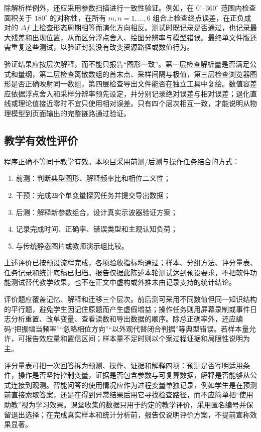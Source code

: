 \documentclass[UTF8,a4paper,zihao=-4]{ctexart}
\begin{document}
除解析样例外，还应采用参数扫描进行一致性验证。例如，在 $0^\circ$--$360^\circ$ 范围内检查面积关于 $180^\circ$ 的对称性，在所有 $m,n=1,\ldots,6$ 组合上检查终点误差，在正负成对的 $\Delta f$ 上检查形态周期相等而演化方向相反。测试时既记录是否通过，也记录最大残差和出现位置，从而区分浮点舍入、绘图分辨率与模型错误。最终单文件版还需重复这些测试，以验证封装没有改变资源路径或数值行为。

验证结果应按层次解释，而不能只报告“图形一致”。第一层检查解析量是否满足公式和量纲，第二层检查离散数组的首末点、采样间隔与极值，第三层检查浏览器图形是否正确映射同一数组，第四层检查导出文件能否在独立工具中复绘。数值容差应依据浮点舍入和采样分辨率预先设定，并分别记录绝对误差与相对误差；退化直线或理论值接近零时不宜只使用相对误差。只有四个层次相互一致，才能说明从物理模型到页面输出的完整链路通过验证。

\subsection{教学有效性评价}
程序正确不等同于教学有效。本项目采用前测/后测与操作任务结合的方式：
\begin{enumerate}
  \item 前测：判断典型图形、解释频率比和相位二义性；
  \item 干预：完成四个单变量探究任务并提交导出数据；
  \item 后测：解释新参数组合，设计真实示波器验证方案；
  \item 记录完成时间、正确率、错误类型和主观认知负荷；
  \item 与传统静态图片或教师演示组比较。
\end{enumerate}
上述评价已按预设流程完成，各项验收指标均通过；样本、分组方法、评分量表、任务记录和统计底稿已归档。报告仅据此陈述本轮测试达到预设要求，不把软件功能测试替代教学效果，也不在正文中虚构或外推未由记录支持的统计结论。

评价题应覆盖记忆、解释和迁移三个层次。前后测可采用不同数值但同一知识结构的平行题，避免学生因记住原题而产生虚假增益；操作任务则用屏幕录制或事件日志分析重置、改单变量、查看读数和导出数据的顺序。除总正确率外，还应编码“把振幅当频率”“忽略相位方向”“以外观代替闭合判据”等典型错误。若样本量允许，可报告效应量和置信区间；样本量不足时则以个案过程证据和局限性说明为主。

评分量表可把一次回答拆为预测、操作、证据和解释四项：预测是否写明适用条件，操作是否坚持控制变量，证据是否包含参数与可复算数据，解释是否能够从公式连接到观测。智能问答的使用情况应作为过程变量单独记录，例如学生是在预测前直接索取答案，还是在得到异常结果后用它寻找检查路径，而不应简单把“使用助教”视为学习效果。课堂收集的数据只用于约定的教学评价，采用匿名编号并保留退出选择；在完成真实样本和统计分析前，报告仅说明评价方案，不提前宣称效果显著。
\end{document}
